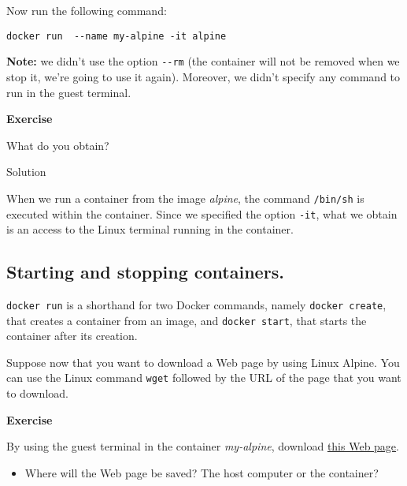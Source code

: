 \documentclass[
]{article}
\providecommand{\tightlist}{%
  \setlength{\itemsep}{0pt}\setlength{\parskip}{0pt}}
\newenvironment{infobox}[1]
  {
  \begin{itemize}
  \renewcommand{\labelitemi}{
    \raisebox{-.7\height}[0pt][0pt]{
      
    }
  }
  \setlength{\fboxsep}{1em}
  \begin{whitebox}
  \item
  }
  {
  \end{whitebox}
  \end{itemize}
  }
\theoremstyle{definition}
\theoremstyle{definition}
\theoremstyle{definition}
\theoremstyle{remark}
\let\BeginKnitrBlock\begin \let\EndKnitrBlock\end
\begin{document}
Now run the following command:

\begin{verbatim}
docker run  --name my-alpine -it alpine
\end{verbatim}

\textbf{Note:} we didn't use the option \texttt{-\/-rm} (the container will not be removed
when we stop it, we're going to use it again).
Moreover, we didn't specify any command to run in the guest terminal.

\begin{infobox}{exercisebox}

\textbf{Exercise}

\BeginKnitrBlock{exercise}
\protect\hypertarget{exr:unnamed-chunk-9}{}{\label{exr:unnamed-chunk-9} }What do you obtain?
\EndKnitrBlock{exercise}

\end{infobox}

Solution

\begin{infobox}{exercisebox}

When we run a container from the image \emph{alpine}, the command
\texttt{/bin/sh} is executed within the container.
Since we specified the option \texttt{-it}, what we obtain is an access to the
Linux terminal running in the container.

\end{infobox}

\hypertarget{starting-and-stopping-containers.}{%
\subsection{Starting and stopping containers.}\label{starting-and-stopping-containers.}}

\texttt{docker\ run} is a shorthand for two Docker commands, namely
\texttt{docker\ create}, that creates a container from an image,
and \texttt{docker\ start}, that starts the container after its creation.

Suppose now that you want to download a Web page
by using Linux Alpine.
You can use the Linux command \texttt{wget} followed by the URL of the page
that you want to download.

\begin{infobox}{exercisebox}

\textbf{Exercise}

\BeginKnitrBlock{exercise}
\protect\hypertarget{exr:unnamed-chunk-10}{}{\label{exr:unnamed-chunk-10} }By using the guest terminal
in the container \emph{my-alpine},
download
\href{https://www.centralesupelec.fr/fr/presentation}{this Web page}.

\begin{itemize}
\tightlist
\item
  Where will the Web page be saved? The host computer or the container?
\end{itemize}
\EndKnitrBlock{exercise}

\end{infobox}
\end{document}
